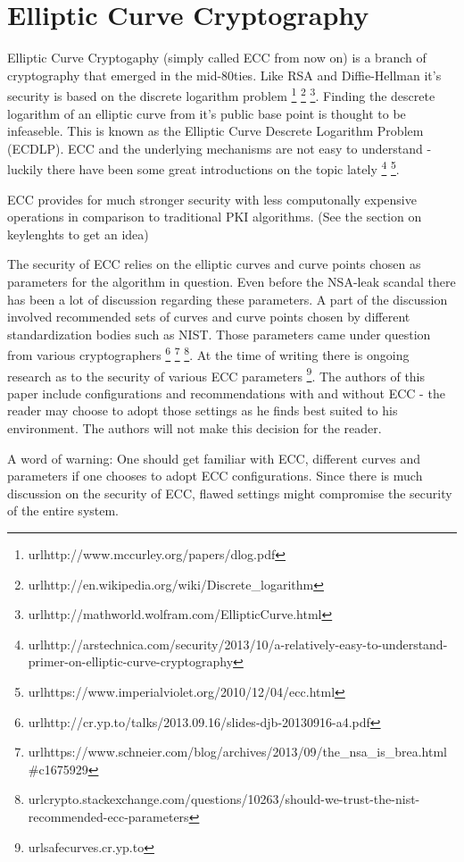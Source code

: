 \section{Elliptic Curve Cryptography}

Elliptic Curve Cryptogaphy (simply called ECC from now on) is a branch of 
cryptography that emerged in the mid-80ties. Like RSA and Diffie-Hellman 
it's security is based on the discrete logarithm problem
\footnote{url{http://www.mccurley.org/papers/dlog.pdf}} 
\footnote{url{http://en.wikipedia.org/wiki/Discrete_logarithm}}
\footnote{url{http://mathworld.wolfram.com/EllipticCurve.html}}.
Finding the descrete logarithm of an elliptic curve from it's public base
point is thought to be infeaseble. This is known as the Elliptic Curve Descrete 
Logarithm Problem (ECDLP). ECC and the underlying mechanisms are not easy 
to understand - luckily there have been some great introductions on the topic lately
\footnote{url{http://arstechnica.com/security/2013/10/a-relatively-easy-to-understand-primer-on-elliptic-curve-cryptography}}
\footnote{url{https://www.imperialviolet.org/2010/12/04/ecc.html}}.

ECC provides for much stronger security with less computonally expensive
operations in comparison to traditional PKI algorithms. (See the section 
on keylenghts to get an idea)

The security of ECC relies on the elliptic curves and curve points chosen
as parameters for the algorithm in question. Even before the NSA-leak scandal
there has been a lot of discussion regarding these parameters. A part of the
discussion involved recommended sets of curves and curve points chosen by
different standardization bodies such as NIST. Those parameters came under
question from various cryptographers
\footnote{url{http://cr.yp.to/talks/2013.09.16/slides-djb-20130916-a4.pdf}}
\footnote{url{https://www.schneier.com/blog/archives/2013/09/the_nsa_is_brea.html#c1675929}}
\footnote{url{crypto.stackexchange.com/questions/10263/should-we-trust-the-nist-recommended-ecc-parameters}}.
At the time of writing there is ongoing research as to the security of 
various ECC parameters
\footnote{url{safecurves.cr.yp.to}}.
The authors of this paper include configurations and recommendations
with and without ECC - the reader may choose to adopt those settings
as he finds best suited to his environment. The authors will not make
this decision for the reader.

A word of warning: One should get familiar with ECC, different curves and
parameters if one chooses to adopt ECC configurations. Since there is much 
discussion on the security of ECC, flawed settings might compromise the 
security of the entire system. %


